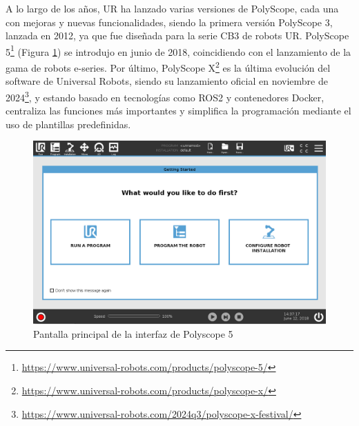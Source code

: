 \pagebreak

A lo largo de los años, UR ha lanzado varias versiones de PolyScope, cada una con mejoras y nuevas funcionalidades, siendo la primera versión PolyScope 3, lanzada en 2012, ya que fue diseñada para la serie CB3 de robots UR. PolyScope 5\footnote{\url{https://www.universal-robots.com/products/polyscope-5/}} (Figura \ref{fig:Polyscope5}) se introdujo en junio de 2018, coincidiendo con el lanzamiento de la gama de robots e-series. Por último, PolyScope X\footnote{\url{https://www.universal-robots.com/products/polyscope-x/}} es la última evolución del software de Universal Robots, siendo su lanzamiento oficial en noviembre de 2024\footnote{\url{https://www.universal-robots.com/2024q3/polyscope-x-festival/}}, y estando basado en tecnologías como ROS2 y contenedores Docker, centraliza las funciones más importantes y simplifica la programación mediante el uso de plantillas predefinidas. %

\begin{figure} [H]
    \begin{center}
      \includegraphics[width=14cm]{figs/InterfazPolyscope5.png}
    \end{center}
    \caption{Pantalla principal de la interfaz de Polyscope 5}
    \label{fig:Polyscope5}
\end{figure}

